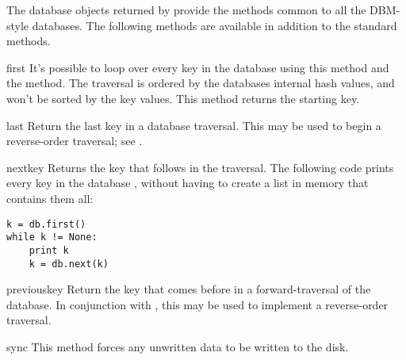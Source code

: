 The database objects returned by  provide the methods 
common to all the DBM-style databases.  The following methods are
available in addition to the standard methods.

\begin{methoddesc}[dbhash]{first}{}
  It's possible to loop over every key in the database using this method 
  and the  method.  The traversal is ordered by
  the databases internal hash values, and won't be sorted by the key
  values.  This method returns the starting key.
\end{methoddesc}

\begin{methoddesc}[dbhash]{last}{}
  Return the last key in a database traversal.  This may be used to
  begin a reverse-order traversal; see .
\end{methoddesc}

\begin{methoddesc}[dbhash]{next}{key}
  Returns the key that follows  in the traversal.  The
  following code prints every key in the database , without
  having to create a list in memory that contains them all:

\begin{verbatim}
k = db.first()
while k != None:
    print k
    k = db.next(k)
\end{verbatim}
\end{methoddesc}

\begin{methoddesc}[dbhash]{previous}{key}
  Return the key that comes before  in a forward-traversal of 
  the database.  In conjunction with , this may be used 
  to implement a reverse-order traversal.
\end{methoddesc}

\begin{methoddesc}[dbhash]{sync}{}
  This method forces any unwritten data to be written to the disk.
\end{methoddesc}
